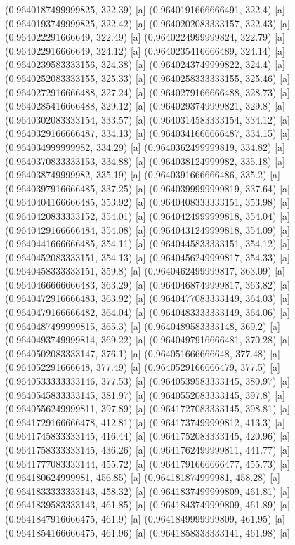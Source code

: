 {{{(0.9640187499999825, 322.39) [a] 
(0.9640191666666491, 322.4) [a] 
(0.9640193749999825, 322.42) [a] 
(0.9640202083333157, 322.43) [a] 
(0.964022291666649, 322.49) [a] 
(0.9640224999999824, 322.79) [a] 
(0.964022916666649, 324.12) [a] 
(0.9640235416666489, 324.14) [a] 
(0.9640239583333156, 324.38) [a] 
(0.9640243749999822, 324.4) [a] 
(0.9640252083333155, 325.33) [a] 
(0.9640258333333155, 325.46) [a] 
(0.9640272916666488, 327.24) [a] 
(0.9640279166666488, 328.73) [a] 
(0.9640285416666488, 329.12) [a] 
(0.9640293749999821, 329.8) [a] 
(0.9640302083333154, 333.57) [a] 
(0.9640314583333154, 334.12) [a] 
(0.9640329166666487, 334.13) [a] 
(0.9640341666666487, 334.15) [a] 
(0.964034999999982, 334.29) [a] 
(0.9640362499999819, 334.82) [a] 
(0.9640370833333153, 334.88) [a] 
(0.964038124999982, 335.18) [a] 
(0.964038749999982, 335.19) [a] 
(0.9640391666666486, 335.2) [a] 
(0.9640397916666485, 337.25) [a] 
(0.9640399999999819, 337.64) [a] 
(0.9640404166666485, 353.92) [a] 
(0.9640408333333151, 353.98) [a] 
(0.9640420833333152, 354.01) [a] 
(0.9640424999999818, 354.04) [a] 
(0.9640429166666484, 354.08) [a] 
(0.9640431249999818, 354.09) [a] 
(0.9640441666666485, 354.11) [a] 
(0.9640445833333151, 354.12) [a] 
(0.9640452083333151, 354.13) [a] 
(0.9640456249999817, 354.33) [a] 
(0.9640458333333151, 359.8) [a] 
(0.9640462499999817, 363.09) [a] 
(0.9640466666666483, 363.29) [a] 
(0.9640468749999817, 363.82) [a] 
(0.9640472916666483, 363.92) [a] 
(0.9640477083333149, 364.03) [a] 
(0.9640479166666482, 364.04) [a] 
(0.9640483333333149, 364.06) [a] 
(0.9640487499999815, 365.3) [a] 
(0.9640489583333148, 369.2) [a] 
(0.9640493749999814, 369.22) [a] 
(0.9640497916666481, 370.28) [a] 
(0.9640502083333147, 376.1) [a] 
(0.964051666666648, 377.48) [a] 
(0.964052291666648, 377.49) [a] 
(0.9640529166666479, 377.5) [a] 
(0.9640533333333146, 377.53) [a] 
(0.9640539583333145, 380.97) [a] 
(0.9640545833333145, 381.97) [a] 
(0.9640552083333145, 397.8) [a] 
(0.9640556249999811, 397.89) [a] 
(0.9641727083333145, 398.81) [a] 
(0.9641729166666478, 412.81) [a] 
(0.9641737499999812, 413.3) [a] 
(0.9641745833333145, 416.44) [a] 
(0.9641752083333145, 420.96) [a] 
(0.9641758333333145, 436.26) [a] 
(0.9641762499999811, 441.77) [a] 
(0.9641777083333144, 455.72) [a] 
(0.9641791666666477, 455.73) [a] 
(0.964180624999981, 456.85) [a] 
(0.964181874999981, 458.28) [a] 
(0.9641833333333143, 458.32) [a] 
(0.9641837499999809, 461.81) [a] 
(0.9641839583333143, 461.85) [a] 
(0.9641843749999809, 461.89) [a] 
(0.9641847916666475, 461.9) [a] 
(0.9641849999999809, 461.95) [a] 
(0.9641854166666475, 461.96) [a] 
(0.9641858333333141, 461.98) [a] 
}}}
